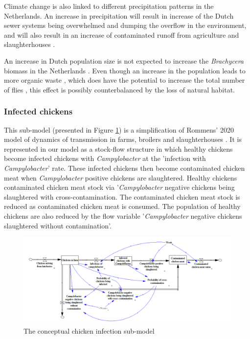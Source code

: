 Climate change is also linked to different precipitation patterns in the Netherlands. An increase in precipitation will result in increase of the Dutch sewer systems being overwhelmed and dumping the overflow in the environment, and will also result in an increase of contaminated runoff from agriculture and slaughterhouses \parencite{kwaad_summer_1991}.

An increase in Dutch population size is not expected to increase the \textit{Brachycera} biomass in the Netherlands \parencite{guenat_effects_2019}. Even though an increase in the population leads to more organic waste \parencite{garcia-garcia_framework_2015}, which does have the potential to increase the total number of flies \parencite{imai_population_1984, rozendaal_houseflies_1997}, this effect is possibly counterbalanced by the loss of natural habitat.



\subsubsection*{Infected chickens}
This sub-model (presented in Figure \ref{fig:transmission_submodel}) is a simplification of Rommens' 2020 model of dynamics of transmission in farms, broilers and slaughterhouses \parencite{rommens_infected_2020}. It is represented in our model as a stock-flow structure in which healthy chickens become infected chickens with \textit{Campylobacter} at the 'infection with \textit{Campylobacter}' rate. These infected chickens then become contaminated chicken meat when \textit{Campylobacter} positive chickens are slaughtered. Healthy chickens  contaminated chicken meat stock via '\textit{Campylobacter} negative chickens being slaughtered with cross-contamination. The contaminated chicken meat stock is reduced as contaminated chicken meat is consumed. The population of healthy chickens are also reduced by the flow variable '\textit{Campylobacter} negative chickens slaughtered without contamination'.

\begin{figure}[h]
\centering
\includegraphics[width=1\textwidth]{images/Transmission submodel.png}
\caption{The conceptual chicken infection sub-model}
\label{fig:transmission_submodel}
\end{figure}

